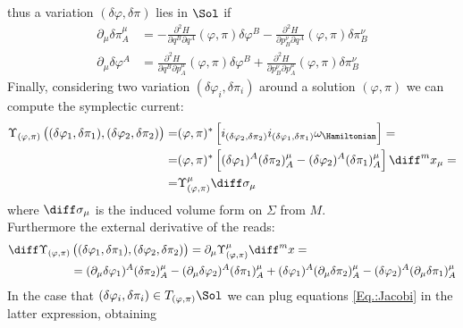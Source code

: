 \documentclass[a4paper,12pt,fleqn]{scrartcl}  %
\begin{document}
thus a variation $(\delta \varphi, \delta \pi)$ lies in $\Sol$ if
\begin{align}\label{Eq.:Jacobi}
	\partial_\mu \delta \pi^\mu_A &=
	- \frac{\partial^2 H}{\partial q^B \partial q^A} (\varphi, \pi) \delta \varphi^B
	- \frac{\partial^2 H}{\partial p^\nu_B \partial q^A} (\varphi, \pi) \delta \pi^\nu_B \\
		\partial_\mu \delta \varphi^A &=
		\frac{\partial^2 H}{\partial q^B \partial p^\mu_A} (\varphi, \pi) \delta \varphi^B +
		\frac{\partial^2 H}{\partial p^\nu_B \partial p^\mu_A}(\varphi, \pi) \delta \pi^\nu_B
\end{align}
%
Finally, considering two variation $(\delta \varphi_i, \delta \pi_i)$ around a solution $(\varphi,\pi)$ we can compute the symplectic current:
\begin{align*}
	\Upsilon_{(\varphi,\pi)} \left( (\delta \varphi_1, \delta \pi_1) , (\delta \varphi_2, \delta \pi_2) \right) = &
	(\varphi, \pi)^\ast \left[ i_{( \delta \varphi_2, \delta \pi_2)} i_{( \delta \varphi_1, \delta \pi_1)} \omega_\Hamiltonian \right] = \\
	= & (\varphi, \pi)^\ast	\left[ (\delta \varphi_1)^A (\delta \pi_2)^\mu_A - (\delta \varphi_2)^A (\delta \pi_1)^\mu_A \right]	\diff^m x_\mu = \\
	= & \Upsilon_{(\varphi,\pi)}^\mu \diff \sigma_\mu
\end{align*}
where $\diff \sigma_\mu $ is the induced volume form on $\Sigma$ from $M$.\\
Furthermore the external derivative of the reads:
\begin{align*}
	\diff \Upsilon_{(\varphi,\pi)} &\left( (\delta \varphi_1, \delta \pi_1) , (\delta \varphi_2, \delta \pi_2) \right)  =
	\partial_\mu \Upsilon_{(\varphi,\pi)}^\mu \diff^mx = \\
	& = (\partial_\mu \delta \varphi_1)^A (\delta \pi_2)^\mu_A - (\partial_\mu \delta \varphi_2)^A (\delta \pi_1)^\mu_A + 
	(\delta \varphi_1)^A (\partial_\mu  \delta \pi_2)^\mu_A - (\delta \varphi_2)^A (\partial_\mu  \delta \pi_1)^\mu_A
\end{align*}
In the case that $(\delta \varphi_i, \delta \pi_i) \in T_{(\varphi,\pi)}\Sol$ we can plug equations \ref{Eq.:Jacobi} in the latter expression, obtaining
\end{document}
